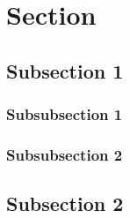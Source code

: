 \section{Section}
\lipsum[1] \cite{kour2014real}

\subsection{Subsection 1}
\lipsum[1]

\subsubsection*{Subsubsection 1}
\lipsum[1]


\subsubsection*{Subsubsection 2}
\lipsum[1]


\subsection{Subsection 2}
